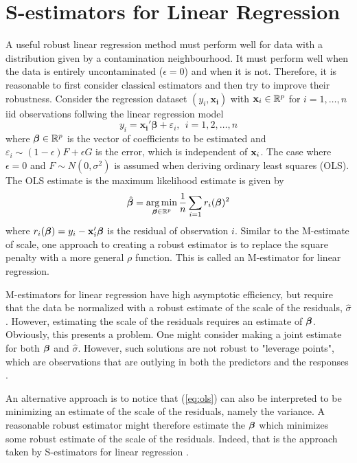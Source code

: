 

\section{S-estimators for Linear Regression}

\newtheorem{lem}{Lemma}

A useful robust linear regression method must perform well for data with a distribution given by a contamination neighbourhood. It must perform well when the data is entirely uncontaminated ($\epsilon = 0$) and when it is not. Therefore, it is reasonable to first consider classical estimators and then try to improve their robustness. Consider the regression dataset $(y_i, \mathbf{x_i})$ with $\mathbf{x}_i \in \mathbb{R}^p$ for $i = 1,\hdots,n$ iid observations follwing the linear regression model
\begin{equation}
\label{eq:linRegr}
    y_i = \mathbf{x_i}' \boldsymbol{\beta} + \varepsilon_i,\ \ i = 1,2,\hdots,n
\end{equation}
where $\bm{\beta} \in \mathbb{R}^p$ is the vector of coefficients to be estimated and $\varepsilon_i \sim (1-\epsilon)F + \epsilon G$ is the error, which is independent of $\mathbf{x}_i$. The case where $\epsilon = 0$ and $F \sim N(0,\sigma^2)$ is assumed when deriving ordinary least squares (OLS). The OLS estimate is the maximum likelihood estimate is given by
\begin{equation}
\label{eq:ols}
    \hat {\bm{\beta}} = \operatorname*{arg\,min}_{\bm{\beta} \in \mathbb{R}^p} \frac{1}{n} \sum_{i=1} r_i(\bm{\beta})^2
\end{equation}
where $r_i(\bm{\beta}) = y_i - \mathbf{x}_i'\bm{\beta}$ is the residual of observation $i$. Similar to the M-estimate of scale, one approach to creating a robust estimator is to replace the square penalty with a more general $\rho$ function. This is called an M-estimator for linear regression. 

M-estimators for linear regression have high asymptotic efficiency, but require that the data be normalized with a robust estimate of the scale of the residuals, $\hat\sigma$. However, estimating the scale of the residuals requires an estimate of $\bm{\beta}$. Obviously, this presents a problem. One might consider making a joint estimate for both $\bm{\beta}$ and $\hat\sigma$. However, such solutions are not robust to "leverage points", which are observations that are outlying in both the predictors and the responses \cite{maronna2019robust}.

An alternative approach is to notice that (\ref{eq:ols}) can also be interpreted to be minimizing an estimate of the scale of the residuals, namely the variance. A reasonable robust estimator might therefore estimate the $\bm{\beta}$ which minimizes some robust estimate of the scale of the residuals. Indeed, that is the approach taken by S-estimators for linear regression \cite{rousseeuw1984robust}.

